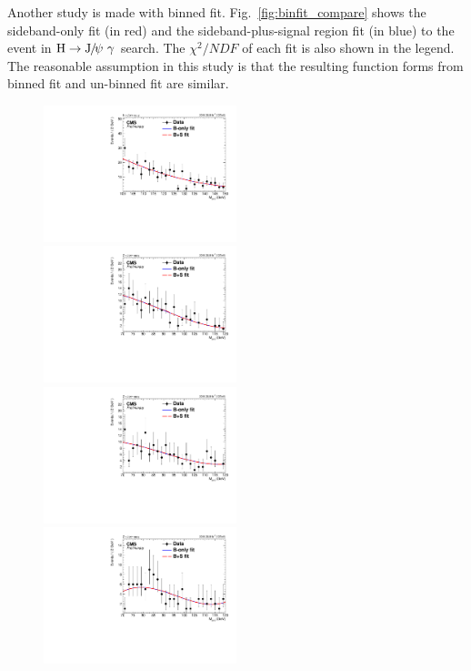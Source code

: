 		Another study is made with binned fit. Fig.~\ref{fig:binfit_compare} shows the sideband-only fit (in red) and the sideband-plus-signal region fit (in blue) to the event in $\PH\to\JPsi\ \gamma$ search. The $\chi^{2}/NDF$ of each fit is also shown in the legend. The reasonable assumption in this study is that the resulting function forms from binned fit and un-binned fit are similar.
		
		\begin{figure}[p]
		    \centering
		    \includegraphics[width=0.5\textwidth]{Fig/Fit/SBFit_fix/BkgSigFit_HJpsiG_Inclusive_Bernstein2}\\
		    \includegraphics[width=0.5\textwidth]{Fig/Fit/SBFit_fix/BkgSigFit_ZJpsiG_EBHR9_Bernstein3}~
		    \includegraphics[width=0.5\textwidth]{Fig/Fit/SBFit_fix/BkgSigFit_ZJpsiG_EBLR9_Bernstein3}\\
		    \includegraphics[width=0.5\textwidth]{Fig/Fit/SBFit_fix/BkgSigFit_ZJpsiG_EE_Bernstein3}\\

\end{figure}
